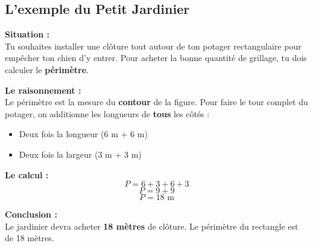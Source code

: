 \documentclass[a4paper]{book}
\begin{document}
    \begin{exemple}
        \section*{L'exemple du Petit Jardinier}

        \begin{minipage}{0.5\linewidth}
            \textbf{Situation :} \\
            Tu souhaites installer une clôture tout autour de ton potager rectangulaire pour empêcher ton chien d'y entrer. Pour acheter la bonne quantité de grillage, tu dois calculer le \textbf{périmètre}.
        \end{minipage}
        \hfill
        \begin{minipage}{0.49\linewidth}
            \begin{center}
            \end{center}
        \end{minipage}

                    
\newpage

            
        \textbf{Le raisonnement :} \\
        Le périmètre est la mesure du \textbf{contour} de la figure. Pour faire le tour complet du potager, on additionne les longueurs de \textbf{tous} les côtés :
        \begin{itemize}
            \item Deux fois la longueur ($6$ m + $6$ m)
            \item Deux fois la largeur ($3$ m + $3$ m)
        \end{itemize}
        
        \textbf{Le calcul :}
        \[ P = 6+3+6+3 \]
        \[ P = 9+9 \]
        \[ P = 18 \text{ m} \]
        
        \textbf{Conclusion :} \\
        Le jardinier devra acheter \textbf{18 mètres} de clôture. Le périmètre du rectangle est de 18 mètres.
    \end{exemple}
    
\end{document}
